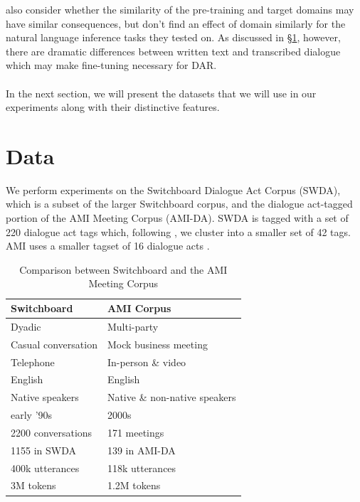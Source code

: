 \documentclass[11pt,a4paper]{article}
\begin{document}
\citet{petersTuneNotTune2019} also consider whether the similarity of the pre-training and target domains may have similar consequences, but don't find an effect of domain similarly for the natural language inference tasks they tested on.
As discussed in \S\ref{sec:data}, however, there are dramatic differences between written text and transcribed dialogue which may make fine-tuning necessary for DAR.

\paragraph{} In the next section, we will present the datasets that we will use in our experiments along with their distinctive features.

\section{Data}\label{sec:data}
We perform experiments on the Switchboard Dialogue Act Corpus (SWDA), which is a subset of the larger Switchboard corpus, and the dialogue act-tagged portion of the AMI Meeting Corpus (AMI-DA). 
SWDA is tagged with a set of 220 dialogue act tags which, following  \citet{jurafskySwitchboardSWBDDAMSLShallowDiscourseFunction1997a}, we cluster into a smaller set of 42 tags.
AMI uses a smaller tagset of 16 dialogue acts \citep{GuidelinesDialogueAct2005}.


\begin{table}[]
\centering
\begin{tabular}{@{}ll@{}}
\toprule
\textbf{Switchboard}       & \textbf{AMI Corpus}                     \\ \midrule
Dyadic                     & Multi-party                             \\
Casual conversation        & Mock business meeting                   \\
Telephone                  & In-person \& video                      \\ \midrule
English                    & English                                 \\ 
Native speakers            & Native \& non-native speakers           \\ 
early '90s                 & 2000s                                   \\ \midrule
2200 conversations         & 171 meetings                            \\
  \hspace{1em} 1155 in SWDA               & \hspace{1em} 139 in AMI-DA                           \\
400k utterances             & 118k utterances                         \\
3M tokens                  & 1.2M tokens                             \\ \bottomrule
\end{tabular}
  \caption{Comparison between Switchboard and the AMI Meeting Corpus}
  \label{table:corpora}
\end{table}
\end{document}
